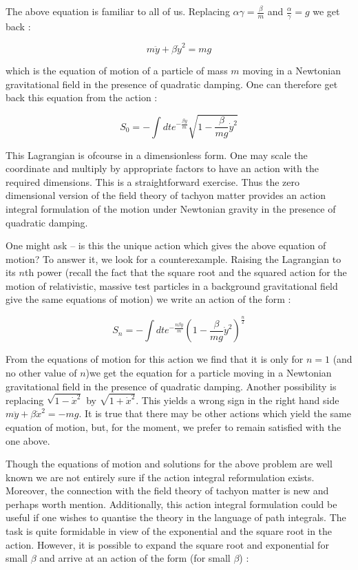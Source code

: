 \documentclass[a4paper,prd,aps,twocolumn]{revtex4}
\begin{document}
{The above equation is familiar to all of us.
Replacing $\alpha \gamma =\frac{\beta}{m}$ and $\frac{\alpha}{\gamma} = g$
we get back :

\begin{equation}
m\ddot y + \beta {\dot y}^2 = mg
\end{equation}

which is the equation of motion of a particle of mass $m$ moving in a
Newtonian gravitational field in the presence of quadratic damping. One can
therefore get back this equation from the action :

\begin{equation}
S_0 = -\int dt e^{-\frac{\beta y}{m}} \sqrt{1-\frac{\beta}{mg}{\dot y}^2}
\end{equation}

This Lagrangian is ofcourse in a dimensionless form. One may scale the
coordinate and multiply by appropriate factors to have an action with
the required dimensions. This is a straightforward exercise.
Thus the zero dimensional version of the field theory of tachyon matter
provides an action integral formulation of the motion under Newtonian
gravity  in the presence of quadratic damping.

One might ask -- is this the unique action which gives the above equation of
motion? To answer it, we look for a counterexample. Raising the Lagrangian
to its $n$th power (recall the fact that the square root and the squared
action for the motion of relativistic, massive test particles in a 
background gravitational
field give the same equations of motion)  we write an action of the form :

\begin{equation}
S_n = -\int dt e^{-\frac{n\beta y}{m}} \left (1-\frac{\beta}{mg}{\dot y}^2
\right )^{\frac{n}{2}}
\end{equation}

From the equations of motion for this action we find that it is only 
for $n=1$ (and no other value of $n$)we get the
equation for a particle moving in a Newtonian gravitational field in 
the presence of quadratic damping. Another possibility is replacing 
$\sqrt{1-{\dot x}^2}$ by $\sqrt{1+{\dot x}^2}$. This yields a wrong sign 
in the right hand side $m\ddot y +\beta {\dot x}^2 = -mg$.
It is true that there may be other actions which yield the
same equation of motion, but, for the moment, we prefer to remain
satisfied with the one above.

Though the equations of motion and solutions for the above problem are well
known we are not entirely sure if the 
action integral reformulation exists. Moreover, the connection
with the field theory of tachyon matter is new and perhaps worth mention.
Additionally, this action integral formulation could be useful if one
wishes to quantise the theory in the language of path integrals. The
task is quite formidable in view of the exponential and the square root
in the action. However, it is possible to expand the square root and
exponential for small $\beta$ and arrive at an action of the form (for
small $\beta$) :

}
\end{document}

